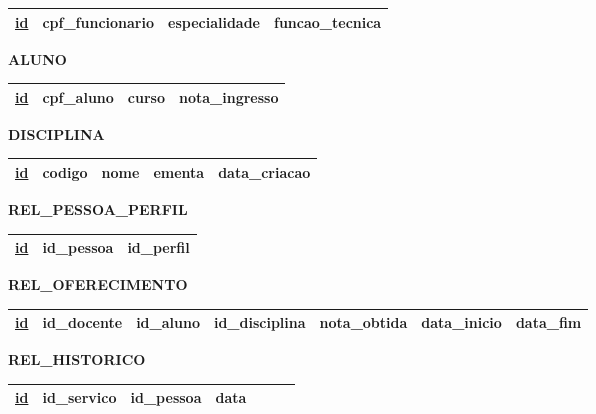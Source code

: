 \documentclass{article}
\begin{document}
\begin{table}[H]
  \renewcommand{\arraystretch}{1.5}
  \begin{tabular}{|c|c|c|c|}
    \hline
    \underline{id} &
    cpf\_funcionario &
    especialidade &
    funcao\_tecnica \\
    \hline
  \end{tabular}
\end{table}

\noindent
\textbf{ALUNO}
\vspace{-5pt}

\begin{table}[H]
  \renewcommand{\arraystretch}{1.5}
  \begin{tabular}{|c|c|c|c|}
    \hline
    \underline{id} &
    cpf\_aluno &
    curso &
    nota\_ingresso \\
    \hline
  \end{tabular}
\end{table}

\noindent
\textbf{DISCIPLINA}
\vspace{-5pt}

\begin{table}[H]
  \renewcommand{\arraystretch}{1.5}
  \begin{tabular}{|c|c|c|c|c|}
    \hline
    \underline{id} &
    codigo &
    nome &
    ementa &
    data\_criacao \\
    \hline
  \end{tabular}
\end{table}

\noindent
\textbf{REL\_PESSOA\_PERFIL}
\vspace{-5pt}

\begin{table}[H]
  \renewcommand{\arraystretch}{1.5}
  \begin{tabular}{|c|c|c|}
    \hline
    \underline{id} &
    id\_pessoa &
    id\_perfil \\
    \hline
  \end{tabular}
\end{table}

\noindent
\textbf{REL\_OFERECIMENTO}
\vspace{-5pt}

\begin{table}[H]
  \renewcommand{\arraystretch}{1.5}
  \begin{tabular}{|c|c|c|c|c|c|c|}
    \hline
    \underline{id} &
    id\_docente &
    id\_aluno &
    id\_disciplina &
    nota\_obtida &
    data\_inicio &
    data\_fim \\
    \hline
  \end{tabular}
\end{table}

\noindent
\textbf{REL\_HISTORICO}
\vspace{-5pt}

\begin{table}[H]
  \renewcommand{\arraystretch}{1.5}
  \begin{tabular}{|c|c|c|c|c|c|c|}
    \hline
    \underline{id} &
    id\_servico &
    id\_pessoa &
    data \\
    \hline
  \end{tabular}
\end{table}
\end{document}
